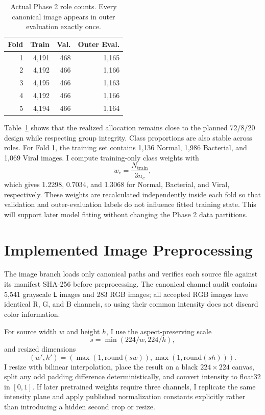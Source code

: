 \documentclass[conference]{IEEEtran}
\begin{document}
\begin{table}[!t]
\caption{Actual Phase 2 role counts. Every canonical image appears in outer evaluation exactly once.}
\label{tab:foldcounts}
\centering
\small
\begin{tabular}{rrrr}
\toprule
Fold & Train & Val. & Outer Eval.\\
\midrule
1 & 4,191 & 468 & 1,165\\
2 & 4,192 & 466 & 1,166\\
3 & 4,195 & 466 & 1,163\\
4 & 4,192 & 466 & 1,166\\
5 & 4,194 & 466 & 1,164\\
\bottomrule
\end{tabular}
\end{table}

Table~\ref{tab:foldcounts} shows that the realized allocation remains close to the planned 72/8/20 design while respecting group integrity. Class proportions are also stable across roles. For Fold 1, the training set contains 1,136 Normal, 1,986 Bacterial, and 1,069 Viral images. I compute training-only class weights with
\begin{equation}
w_c=\frac{N_{\mathrm{train}}}{3n_c},
\end{equation}
which gives 1.2298, 0.7034, and 1.3068 for Normal, Bacterial, and Viral, respectively. These weights are recalculated independently inside each fold so that validation and outer-evaluation labels do not influence fitted training state. This will support later model fitting without changing the Phase 2 data partitions.

\section{Implemented Image Preprocessing}

The image branch loads only canonical paths and verifies each source file against its manifest SHA-256 before preprocessing. The canonical channel audit contains 5,541 grayscale \texttt{L} images and 283 RGB images; all accepted RGB images have identical R, G, and B channels, so using their common intensity does not discard color information.

For source width $w$ and height $h$, I use the aspect-preserving scale
\begin{equation}
s=\min(224/w,224/h),
\end{equation}
and resized dimensions
\begin{equation}
(w',h')=(\max(1,\mathrm{round}(sw)),\max(1,\mathrm{round}(sh))).
\end{equation}
I resize with bilinear interpolation, place the result on a black $224\times224$ canvas, split any odd padding difference deterministically, and convert intensity to float32 in $[0,1]$. If later pretrained weights require three channels, I replicate the same intensity plane and apply published normalization constants explicitly rather than introducing a hidden second crop or resize.
\end{document}
